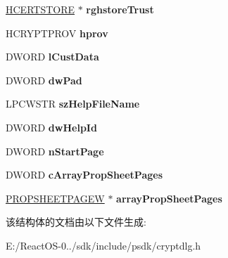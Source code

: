 \begin{DoxyCompactItemize}
\hyperlink{interfacevoid}{H\+C\+E\+R\+T\+S\+T\+O\+RE} $\ast$ {\bfseries rghstore\+Trust}
\item 
\mbox{\label{structtag_c_e_r_t___v_i_e_w_p_r_o_p_e_r_t_i_e_s___s_t_r_u_c_t___w_ac25ebd22bba59b8995f56e4a6a236d0f}} 
H\+C\+R\+Y\+P\+T\+P\+R\+OV {\bfseries hprov}
\item 
\mbox{\label{structtag_c_e_r_t___v_i_e_w_p_r_o_p_e_r_t_i_e_s___s_t_r_u_c_t___w_a6199bee98dc3ef00f96df905fc51a8a5}} 
D\+W\+O\+RD {\bfseries l\+Cust\+Data}
\item 
\mbox{\label{structtag_c_e_r_t___v_i_e_w_p_r_o_p_e_r_t_i_e_s___s_t_r_u_c_t___w_a52c71e6a6dfa073c945f29b819a7407d}} 
D\+W\+O\+RD {\bfseries dw\+Pad}
\item 
\mbox{\label{structtag_c_e_r_t___v_i_e_w_p_r_o_p_e_r_t_i_e_s___s_t_r_u_c_t___w_a6b043de4f7d7127eaee9e2d108d69eaa}} 
L\+P\+C\+W\+S\+TR {\bfseries sz\+Help\+File\+Name}
\item 
\mbox{\label{structtag_c_e_r_t___v_i_e_w_p_r_o_p_e_r_t_i_e_s___s_t_r_u_c_t___w_aefcfb68502fa5d1c3bae7ac23ea4e4fc}} 
D\+W\+O\+RD {\bfseries dw\+Help\+Id}
\item 
\mbox{\label{structtag_c_e_r_t___v_i_e_w_p_r_o_p_e_r_t_i_e_s___s_t_r_u_c_t___w_a19325406c4672192cc931cae57c8bcc4}} 
D\+W\+O\+RD {\bfseries n\+Start\+Page}
\item 
\mbox{\label{structtag_c_e_r_t___v_i_e_w_p_r_o_p_e_r_t_i_e_s___s_t_r_u_c_t___w_a52c3e81967fdb3d30821272f62f4b383}} 
D\+W\+O\+RD {\bfseries c\+Array\+Prop\+Sheet\+Pages}
\item 
\mbox{\label{structtag_c_e_r_t___v_i_e_w_p_r_o_p_e_r_t_i_e_s___s_t_r_u_c_t___w_a1707970f99425a9a0041e8106ad0c9bb}} 
\hyperlink{struct___p_r_o_p_s_h_e_e_t_p_a_g_e_w}{P\+R\+O\+P\+S\+H\+E\+E\+T\+P\+A\+G\+EW} $\ast$ {\bfseries array\+Prop\+Sheet\+Pages}
\end{DoxyCompactItemize}


该结构体的文档由以下文件生成\+:\begin{DoxyCompactItemize}
\item 
E\+:/\+React\+O\+S-\/0../sdk/include/psdk/cryptdlg.\+h\end{DoxyCompactItemize}

